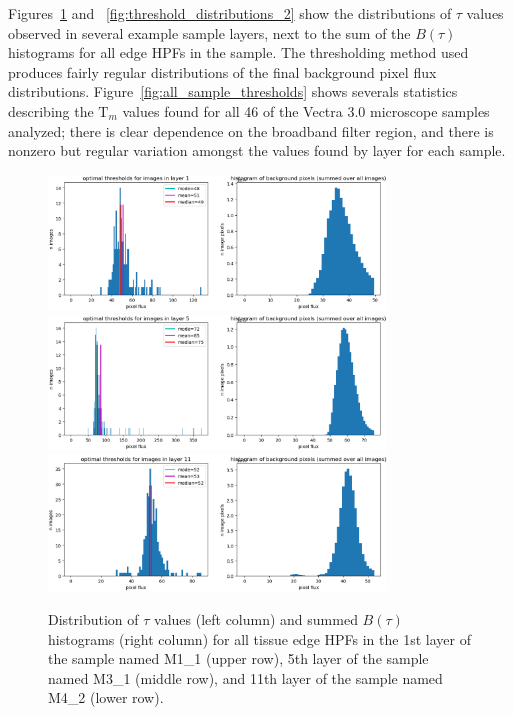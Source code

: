 \documentclass[letterpaper,11pt]{article}
\newcommand{\reffig}[1]{Figure~\ref{#1}}
\newcommand{\Tau}{\mathrm{T}}
\begin{document}
Figures~\ref{fig:threshold_distributions_1} and ~\ref{fig:threshold_distributions_2} show the distributions of $\tau$ values observed in several example sample layers, next to the sum of the $B(\tau)$ histograms for all edge HPFs in the sample. The thresholding method used produces fairly regular distributions of the final background pixel flux distributions. \reffig{fig:all_sample_thresholds} shows severals statistics describing the $\Tau_{m}$ values found for all 46 of the Vectra 3.0 microscope samples analyzed; there is clear dependence on the broadband filter region, and there is nonzero but regular variation amongst the values found by layer for each sample.

\begin{figure}[!ht]
\centering
\includegraphics[width=0.80\textwidth]{images/masking/M1_1_layer_1_background_threshold_plots}
\includegraphics[width=0.80\textwidth]{images/masking/M3_1_layer_5_background_threshold_plots}
\includegraphics[width=0.80\textwidth]{images/masking/M4_2_layer_11_background_threshold_plots}
\caption{\footnotesize Distribution of $\tau$ values (left column) and summed $B(\tau)$ histograms (right column) for all tissue edge HPFs in the 1st layer of the sample named M1\_1 (upper row), 5th layer of the sample named M3\_1 (middle row), and 11th layer of the sample named M4\_2 (lower row).}
\label{fig:threshold_distributions_1}
\end{figure}
\end{document}
